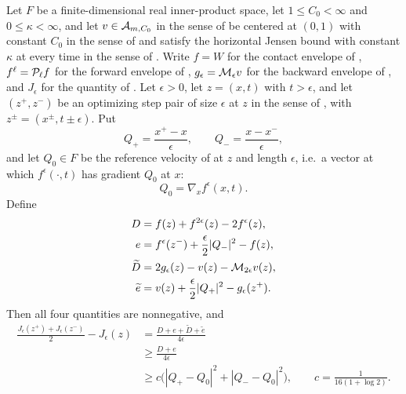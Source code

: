 \begin{lemma}
Let $F$ be a finite-dimensional real inner-product space, let
$1\le C_0<\infty$ and $0\le\kappa<\infty$, and let $v\in\mathcal{A}_{m,C_0}$ in the
sense of  be centered at $(0,1)$ with constant $C_0$ in the
sense of  and satisfy the horizontal Jensen bound with
constant $\kappa$ at every time in the sense of . Write
$f=W$ for the contact envelope of , $f^\ell=\mathcal{P}_\ell f$
for the forward envelope of , $g_\epsilon=\mathcal{M}_\epsilon v$
for the backward envelope of , and $J_\epsilon$ for the
quantity of . Let $\epsilon>0$, let $z=(x,t)$ with
$t>\epsilon$, and let $(z^+,z^-)$ be an optimizing step pair of size $\epsilon$
at $z$ in the sense of , with $z^\pm=(x^\pm,t\pm\epsilon)$.
Put
\[
  Q_+=\frac{x^+-x}{\epsilon},\qquad
  Q_-=\frac{x-x^-}{\epsilon},
\]
and let $Q_0\in F$ be the reference velocity of
 at $z$ and length $\epsilon$, i.e.\ a vector at
which $f^\epsilon(\cdot,t)$ has gradient $Q_0$ at $x$:
\[
  Q_0=\nabla_xf^\epsilon(x,t).
\]
Define
\begin{align*}
  D&=f(z)+f^{2\epsilon}(z)-2f^\epsilon(z),\\
  e&=f^\epsilon(z^-)+\frac{\epsilon}{2}|Q_-|^2-f(z),\\
  \widetilde D&=2g_\epsilon(z)-v(z)-\mathcal{M}_{2\epsilon}v(z),\\
  \widetilde e&=v(z)+\frac{\epsilon}{2}|Q_+|^2-g_\epsilon(z^+).
\end{align*}
Then all four quantities are nonnegative, and
\begin{equation}\label{eq:dp-drift}
\begin{split}
  \frac{J_\epsilon(z^+)+J_\epsilon(z^-)}{2}-J_\epsilon(z)
  &=\frac{D+e+\widetilde D+\widetilde e}{4\epsilon}\\
  &\ge\frac{D+e}{4\epsilon}\\
  &\ge c\bigl(|Q_+-Q_0|^2+|Q_--Q_0|^2\bigr),
  \qquad c=\frac{1}{16(1+\log2)}.
\end{split}
\end{equation}
\end{lemma}
